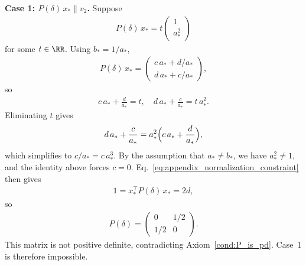\documentclass{article}
\begin{document}
\textbf{Case 1: $P(\delta)\, x_* \parallel v_2$.}
Suppose
\begin{align}
    P(\delta)\, x_* = t \begin{pmatrix} 1 \\ a_*^2 \end{pmatrix}
\end{align}
for some $t \in \RR$. Using $b_* = 1/a_*$,
\begin{align}
    P(\delta)\, x_*
    =
    \begin{pmatrix}
        c\, a_* + d/a_* \\
        d\, a_* + c/a_*
    \end{pmatrix},
\end{align}
so
\begin{align}
    c\, a_* + \frac{d}{a_*} = t,
    \quad
    d\, a_* + \frac{c}{a_*} = t\, a_*^2.
\end{align}
Eliminating $t$ gives
\begin{align}
    d\, a_* + \frac{c}{a_*}
    = a_*^2 \Bigl(c\, a_* + \frac{d}{a_*}\Bigr),
\end{align}
which simplifies to $c/a_* = c\, a_*^3$. By the assumption that $a_* \ne b_*$, we have $a_*^2 \neq 1$, and the
identity above forces $c = 0$.
Eq.~\eqref{eq:appendix_normalization_constraint} then gives
\begin{align}
    1 = x_*^\top P(\delta)\, x_* = 2d,
\end{align}
so
\begin{align}
    P(\delta)
    =
    \begin{pmatrix}
        0 & 1/2 \\
        1/2 & 0
    \end{pmatrix}.
\end{align}
This matrix is not positive definite, contradicting Axiom~\ref{cond:P_is_pd}. Case~1
is therefore impossible.
\end{document}
